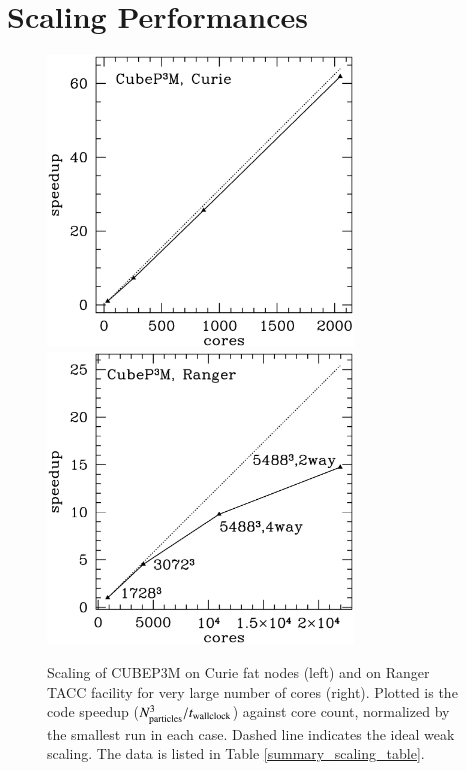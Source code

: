 \section{Scaling Performances}


\begin{figure}%
  \begin{center}
    \includegraphics[width=3.2in]{graphs/scaling_cubep3m_curie.eps}
    \includegraphics[width=3.2in]{graphs/scaling_cubep3m_new.eps}
  \caption{Scaling of {\small CUBEP3M} on Curie fat nodes (left) and 
    on Ranger TACC facility for very large number of cores (right). Plotted is the code speedup 
    ($N_{\rm particles}^3/t_{\rm wallclock}$) against core count, normalized by the smallest run 
    in each case. Dashed line indicates the ideal weak 
    scaling. The data is listed in Table \ref{summary_scaling_table}.
    \label{scaling}
}
\end{center}
\end{figure}

